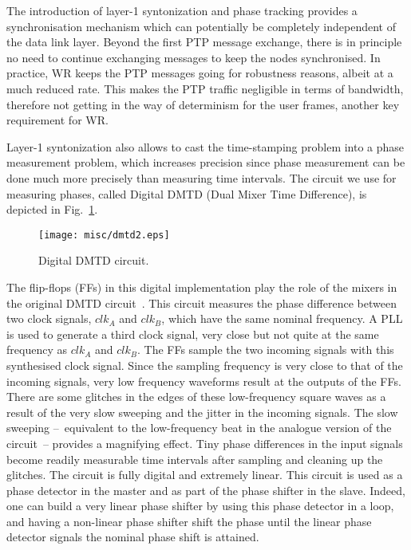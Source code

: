 \documentclass{../JAC2003}
\begin{document}
The introduction of layer-1 syntonization and phase tracking provides
a synchronisation mechanism which can potentially be completely
independent of the data link layer. Beyond the first PTP message
exchange, there is in principle no need to continue exchanging
messages to keep the nodes synchronised. In practice, WR keeps the PTP
messages going for robustness reasons, albeit at a much reduced
rate. This makes the PTP traffic negligible in terms of bandwidth,
therefore not getting in the way of determinism for the user frames,
another key requirement for WR. 

Layer-1 syntonization also allows to cast the time-stamping problem
into a phase measurement problem, which increases precision since
phase measurement can be done much more precisely than measuring time
intervals. The circuit we use for measuring phases, called Digital
DMTD (Dual Mixer Time Difference), is depicted in
Fig.~\ref{ddmtd-fig}.

\begin{figure}[htb]
   \centering
   \texttt{[image: misc/dmtd2.eps]}
   \caption{Digital DMTD circuit.}
   \label{ddmtd-fig}
\end{figure}

The flip-flops (FFs) in this digital implementation play the role of
the mixers in the original DMTD circuit~\cite{dmtd-ref}. This circuit
measures the phase difference between two clock signals, $clk_A$ and
$clk_B$, which have the same nominal frequency. A PLL is used to
generate a third clock signal, very close but not quite at the same
frequency as $clk_A$ and $clk_B$. The FFs sample the two incoming
signals with this synthesised clock signal. Since the sampling
frequency is very close to that of the incoming signals, very low
frequency waveforms result at the outputs of the FFs. There are some
glitches in the edges of these low-frequency square waves as a result
of the very slow sweeping and the jitter in the incoming signals. The
slow sweeping --~equivalent to the low-frequency beat in the analogue
version of the circuit~-- provides a magnifying effect. Tiny phase
differences in the input signals become readily measurable time
intervals after sampling and cleaning up the glitches. The circuit is
fully digital and extremely linear. This circuit is used as a phase
detector in the master and as part of the phase shifter in the
slave. Indeed, one can build a very linear phase shifter by using this
phase detector in a loop, and having a non-linear phase shifter shift
the phase until the linear phase detector signals the nominal phase
shift is attained.
\end{document}

